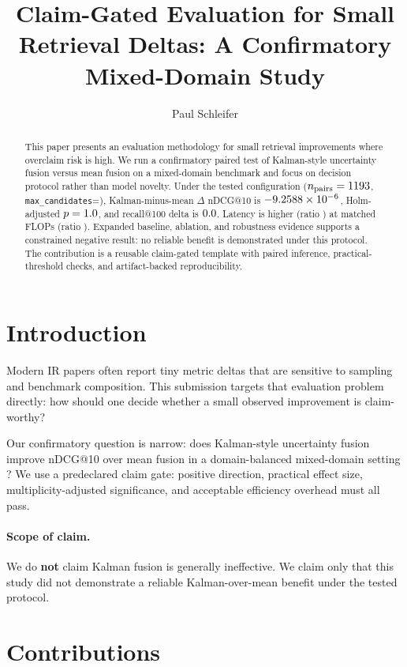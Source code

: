 \documentclass[10pt]{article}
\title{Claim-Gated Evaluation for Small Retrieval Deltas: A Confirmatory Mixed-Domain Study}
\author{Paul Schleifer}
\begin{document}
\maketitle

\begin{abstract}
This paper presents an evaluation methodology for small retrieval improvements where overclaim risk is high. We run a confirmatory paired test of Kalman-style uncertainty fusion versus mean fusion on a mixed-domain benchmark and focus on decision protocol rather than model novelty. Under the tested configuration ($n_{\text{pairs}}=1193$, \texttt{max\_candidates}=\CandidateCap), Kalman-minus-mean $\Delta$ nDCG@10 is \(-9.2588\times10^{-6}\), Holm-adjusted \(p=1.0\), and recall@100 delta is \(0.0\). Latency is higher (ratio \LatencyRatio) at matched FLOPs (ratio \FlopsRatio). Expanded baseline, ablation, and robustness evidence supports a constrained negative result: no reliable benefit is demonstrated under this protocol. The contribution is a reusable claim-gated template with paired inference, practical-threshold checks, and artifact-backed reproducibility.
\end{abstract}

\section{Introduction}
Modern IR papers often report tiny metric deltas that are sensitive to sampling and benchmark composition. This submission targets that evaluation problem directly: how should one decide whether a small observed improvement is claim-worthy?

Our confirmatory question is narrow: does Kalman-style uncertainty fusion \cite{kalman1960} improve nDCG@10 \cite{jarvelin2002} over mean fusion in a domain-balanced mixed-domain setting \cite{thakur2021beir}? We use a predeclared claim gate: positive direction, practical effect size, multiplicity-adjusted significance, and acceptable efficiency overhead must all pass.

\paragraph{Scope of claim.}
We do \textbf{not} claim Kalman fusion is generally ineffective. We claim only that this study did not demonstrate a reliable Kalman-over-mean benefit under the tested protocol.

\section{Contributions}

\end{document}
